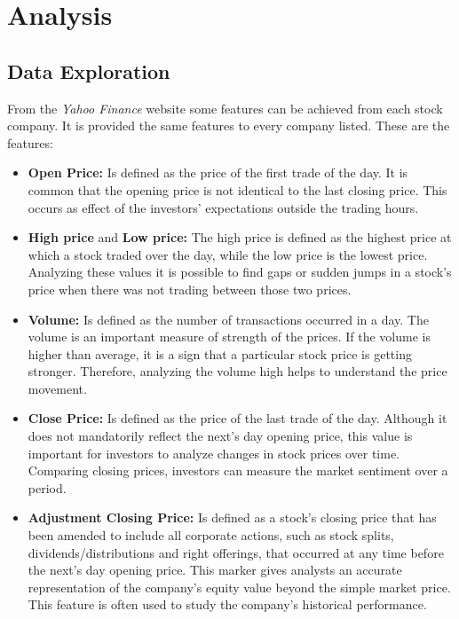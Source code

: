 \section{Analysis}
\label{sec:analysis}

\subsection{Data Exploration}
\label{subsec:data_exploration}
From the \textit{Yahoo Finance} website some features can be achieved from each stock company. It is provided the same features to every company listed.
These are the features:\\
\begin{itemize}
  \item \textbf{Open Price:}
    Is defined as the price of the first trade of the day. It is common that the opening price is not identical
    to the last closing price. This occurs as effect of the investors' expectations outside the trading hours.\\
  \item \textbf{High price} and \textbf{Low price:}
    The high price is defined as the highest price at which a stock traded over the day, while the low price is the lowest price. Analyzing these values it is
    possible to find gaps or sudden jumps in a stock's price when there was not trading between those two prices.\\ 
  \item \textbf{Volume:} 
    Is defined as the number of transactions occurred in a day. The volume is an important measure of strength of the prices. If the volume is 
    higher than average, it is a sign that a particular stock price is getting stronger. Therefore, analyzing the volume high helps to understand the price
    movement.\\

  \item \textbf{Close Price:}
    Is defined as the price of the last trade of the day. Although it does not mandatorily reflect the next's day opening price, this value is
    important for investors to analyze changes in stock prices over time. Comparing closing prices, investors can measure the market sentiment over a period.\\
 
  \item \textbf{Adjustment Closing Price:}
    Is defined as a stock's closing price that has been amended to include all corporate actions, such as stock splits, dividends/distributions and right offerings, that
    occurred at any time before the next's day opening price. This marker gives analysts an accurate representation of the company's equity value beyond the simple market price.
    This feature is often used to study the company's historical performance.\\

\end{itemize} 
